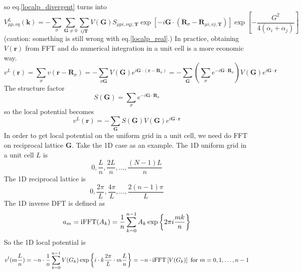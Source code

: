 \documentclass{article}
\begin{document}
            so eq.\eqref{localp_divergent} turns into
            \begin{equation}
                V_{\mu p,\nu q}^L(\textbf{k}) = -\sum_{\sigma}\sum_{\textbf{G}\neq 0}\sum_{ij\textbf{T}}V(\textbf{G})S_{\mu pi,\nu qj,\textbf{T}}
                \exp\left[-i\textbf{G}\cdot(\textbf{R}_{\sigma}-\textbf{R}_{\mu i,\nu j,\textbf{T}})\right]\exp\left[-\frac{G^2}{4(\alpha_i+\alpha_j)}\right]\label{localp_real}
            \end{equation}
            (caution: something is still wrong with eq.\eqref{localp_real}.)
            In practice, obtaining $V(\textbf{r})$ from FFT and do numerical integration in a unit cell is a more economic way.
            \begin{equation*}
                v^L(\textbf{r}) = \sum_{\sigma}v(\textbf{r}-\textbf{R}_{\sigma}) = 
                -\sum_{\sigma\textbf{G}}V(\textbf{G})e^{i\textbf{G}\cdot(\textbf{r}-\textbf{R}_{\sigma})} =
                -\sum_{\textbf{G}}\left(\sum_{\sigma}e^{-i\textbf{G}\cdot\textbf{R}_{\sigma}}\right)V(\textbf{G})e^{i\textbf{G}\cdot\textbf{r}}
            \end{equation*}
            The structure factor
            \begin{equation}
                S(\textbf{G}) = \sum_{\sigma}e^{-i\textbf{G}\cdot\textbf{R}_{\sigma}}
            \end{equation}
            so the local potential becomes
            \begin{equation}
                v^L(\textbf{r}) = -\sum_{\textbf{G}}S(\textbf{G})V(\textbf{G})e^{i\textbf{G}\cdot\textbf{r}}
            \end{equation}
            In order to get local potential on the uniform grid in a unit cell, 
            we need do FFT on reciprocal lattice $\textbf{G}$.
            Take the 1D case as an example.
            The 1D uniform grid in a unit cell $L$ is
            $$ 0,\frac{L}{n},\frac{2L}{n},\dots,\frac{(N-1)L}{n} $$
            The 1D reciprocal lattice is
            $$ 0,\frac{2\pi}{L},\frac{4\pi}{L},\dots,\frac{2(n-1)\pi}{L} $$
            The 1D inverse DFT is defined as
            \begin{equation}
                a_m = {\rm iFFT}(A_k) = \frac{1}{n}\sum_{k=0}^{n-1}A_k\exp\left\{2\pi i\frac{mk}{n}\right\}
            \end{equation}
            So the 1D local potential is
            \begin{equation}
                v^l(m\frac{L}{n}) = -n\cdot\frac{1}{n}\sum_{k=0}^{n-1}V(G_k)\exp\left\{i\cdot k\frac{2\pi}{L}\cdot m\frac{L}{n}\right\}
                = -n\cdot {\rm iFFT}\left[V(G_k)\right]\ {\rm for}\ m = 0,1,\dots,n-1
            \end{equation}
\end{document}
